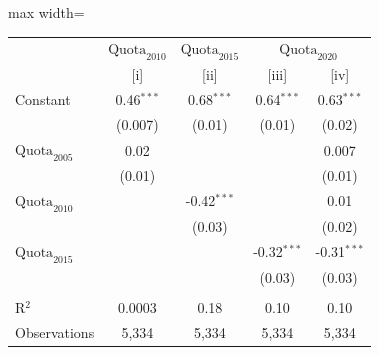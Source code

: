 
\begingroup
\centering
\scriptsize
\begin{adjustbox}{max width=\linewidth}
   \begin{threeparttable}[b]
      \begin{tabular}{lcccc}
         \toprule
          & \textit{$\text{Quota}_{2010}$} & \textit{$\text{Quota}_{2015}$} & \multicolumn{2}{c}{\textit{$\text{Quota}_{2020}$}}\\
                                & [i]          & [ii]          & [iii]         & [iv]\\  
         \midrule 
         Constant               & 0.46$^{***}$ & 0.68$^{***}$  & 0.64$^{***}$  & 0.63$^{***}$\\   
                                & (0.007)      & (0.01)        & (0.01)        & (0.02)\\   
         $\text{Quota}_{2005}$  & 0.02         &               &               & 0.007\\   
                                & (0.01)       &               &               & (0.01)\\   
         $\text{Quota}_{2010}$  &              & -0.42$^{***}$ &               & 0.01\\   
                                &              & (0.03)        &               & (0.02)\\   
         $\text{Quota}_{2015}$  &              &               & -0.32$^{***}$ & -0.31$^{***}$\\   
                                &              &               & (0.03)        & (0.03)\\   
          \\
         R$^2$                  & 0.0003       & 0.18          & 0.10          & 0.10\\  
         Observations           & 5,334        & 5,334         & 5,334         & 5,334\\  
         \bottomrule
      \end{tabular}
   \end{threeparttable}
\end{adjustbox}
\par\endgroup


